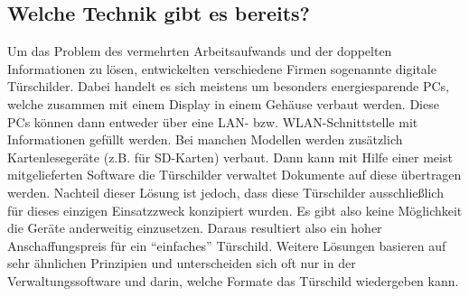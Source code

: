 \begin{flushleft}
\section{Welche Technik gibt es bereits?}
Um das Problem des vermehrten Arbeitsaufwands und der doppelten Informationen zu lösen, entwickelten verschiedene Firmen sogenannte digitale Türschilder. Dabei handelt es sich meistens um besonders energiesparende PCs, welche zusammen mit einem Display in einem Gehäuse verbaut werden. Diese PCs können dann entweder über eine LAN- bzw. WLAN-Schnittstelle mit Informationen gefüllt werden.
\pagebreak
Bei manchen Modellen werden zusätzlich Kartenlesegeräte (z.B. für SD-Karten) verbaut. Dann kann mit Hilfe einer meist mitgelieferten Software die Türschilder verwaltet Dokumente auf diese übertragen werden. 
Nachteil dieser Lösung ist jedoch, dass diese Türschilder ausschließlich für dieses einzigen Einsatzzweck konzipiert wurden. Es gibt also keine Möglichkeit die Geräte anderweitig einzusetzen. Daraus resultiert also ein hoher Anschaffungspreis für ein ``einfaches'' Türschild. 
Weitere Lösungen basieren auf sehr ähnlichen Prinzipien und unterscheiden sich oft nur in der Verwaltungssoftware und darin, welche Formate das Türschild wiedergeben kann. 
\end{flushleft}


